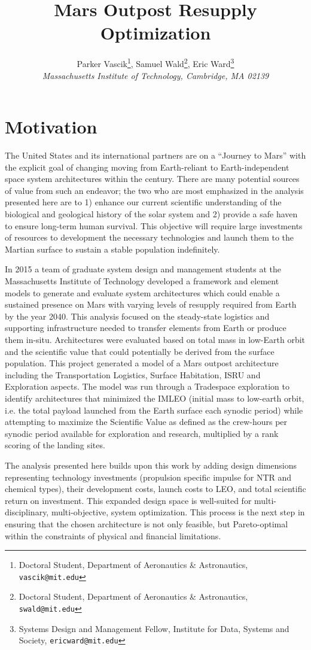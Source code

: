 \documentclass[]{aiaa-pretty}
\author[Vascik, Wald, and Ward]{ %
Parker Vascik\thanks{Doctoral Student, Department of Aeronautics \& Astronautics, \texttt{vascik@mit.edu}},
Samuel Wald\thanks{Doctoral Student, Department of Aeronautics \& Astronautics, \texttt{swald@mit.edu}},
Eric Ward\thanks{Systems Design and Management Fellow, Institute for Data, Systems and Society, \texttt{ericward@mit.edu}}\\
\textit{Massachusetts Institute of Technology, Cambridge, MA 02139}}
\title{Mars Outpost Resupply Optimization}
\begin{document}
\maketitle

\section{Motivation}
\label{sec:Motivation}
The United States and its international partners are on a “Journey to Mars” with the explicit goal of changing moving from Earth-reliant to Earth-independent space system architectures within the century. \cite{craig2015pioneering} There are many potential sources of value from such an endeavor; the two who are most emphasized in the analysis presented here are to 1) enhance our current scientific understanding of the biological and geological history of the solar system and 2) provide a safe haven to ensure long-term human survival. \cite{NRC2014} This objective will require large investments of resources to development the necessary technologies and launch them to the Martian surface to sustain a stable population indefinitely. 

In 2015 a team of graduate system design and management students at the Massachusetts Institute of Technology developed a framework and element models to generate and evaluate system architectures which could enable a sustained presence on Mars with varying levels of resupply required from Earth by the year 2040. This analysis focused on the steady-state logistics and supporting infrastructure needed to transfer elements from Earth or produce them in-situ. Architectures were evaluated based on total mass in low-Earth orbit and the scientific value that could potentially be derived from the surface population. This project generated a model of a Mars outpost architecture including the Transportation Logistics, Surface Habitation, ISRU and Exploration aspects. The model was run through a Tradespace exploration to identify architectures that minimized the IMLEO (initial mass to low-earth orbit, i.e. the total payload launched from the Earth surface each synodic period) while attempting to maximize the Scientific Value as defined as the crew-hours per synodic period available for exploration and research, multiplied by a rank scoring of the landing sites.

The analysis presented here builds upon this work by adding design dimensions representing technology investments (propulsion specific impulse for NTR and chemical types), their development costs, launch costs to LEO, and total scientific return on investment. This expanded design space is well-suited for multi-disciplinary, multi-objective, system optimization. This process is the next step in ensuring that the chosen architecture is not only feasible, but Pareto-optimal within the constraints of physical and financial limitations. 
\end{document}
